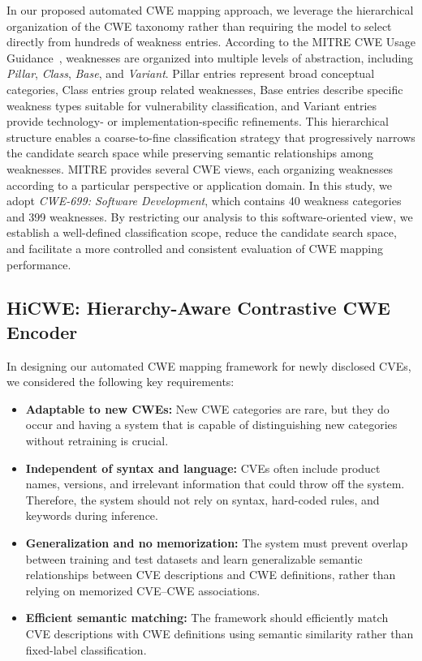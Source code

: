 \documentclass[conference,compsoc]{IEEEtran}
\begin{document}
In our proposed automated CWE mapping approach, we leverage the hierarchical organization of the CWE taxonomy rather than requiring the model to select directly from hundreds of weakness entries. According to the MITRE CWE Usage Guidance~\cite{mitre_cwe_guidance}, weaknesses are organized into multiple levels of abstraction, including \emph{Pillar}, \emph{Class}, \emph{Base}, and \emph{Variant}. Pillar entries represent broad conceptual categories, Class entries group related weaknesses, Base entries describe specific weakness types suitable for vulnerability classification, and Variant entries provide technology- or implementation-specific refinements. This hierarchical structure enables a coarse-to-fine classification strategy that progressively narrows the candidate search space while preserving semantic relationships among weaknesses. MITRE provides several CWE views, each organizing weaknesses according to a particular perspective or application domain. In this study, we adopt \emph{CWE-699: Software Development}, which contains 40 weakness categories and 399 weaknesses. By restricting our analysis to this software-oriented view, we establish a well-defined classification scope, reduce the candidate search space, and facilitate a more controlled and consistent evaluation of CWE mapping performance.





\subsection{HiCWE: Hierarchy-Aware Contrastive CWE Encoder}

In designing our automated CWE mapping framework for newly disclosed CVEs, we considered the following key requirements:

\begin{itemize}
    \item \textbf{Adaptable to new CWEs:} New CWE categories are rare, but they do occur and having a system that is capable of distinguishing new categories without retraining is crucial.
    \item \textbf{Independent of syntax and language:} CVEs often include product names, versions, and irrelevant information that could throw off the system. Therefore, the system should not rely on syntax, hard-coded rules, and keywords during inference.
    
\item \textbf{Generalization and no memorization:}
The system must prevent overlap between training and
test datasets and learn generalizable semantic
relationships between CVE descriptions and CWE
definitions, rather than relying on memorized
CVE--CWE associations.

\item \textbf{Efficient semantic matching:}
    The framework should efficiently match CVE
    descriptions with CWE definitions using semantic
    similarity rather than fixed-label classification.

\end{itemize}
\end{document}

